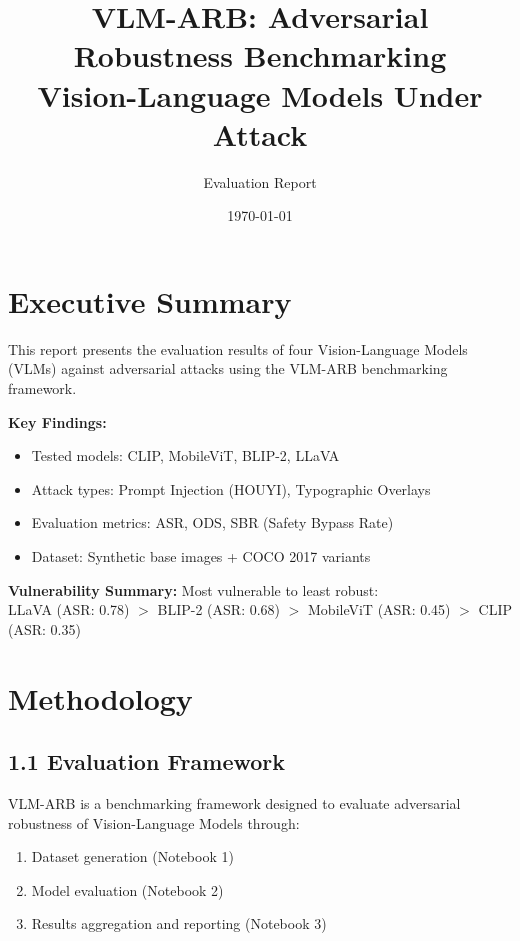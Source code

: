 \documentclass[12pt, a4paper]{article}
\title{\textbf{\Large VLM-ARB: Adversarial Robustness Benchmarking\\
Vision-Language Models Under Attack}}
\author{Evaluation Report}
\date{\today}
\begin{document}
\maketitle

\section{Executive Summary}

This report presents the evaluation results of four Vision-Language Models (VLMs) against adversarial attacks using the VLM-ARB benchmarking framework. 

\textbf{Key Findings:}
\begin{itemize}
    \item Tested models: CLIP, MobileViT, BLIP-2, LLaVA
    \item Attack types: Prompt Injection (HOUYI), Typographic Overlays
    \item Evaluation metrics: ASR, ODS, SBR (Safety Bypass Rate)
    \item Dataset: Synthetic base images + COCO 2017 variants
\end{itemize}

\vspace{12pt}
\noindent
\textbf{Vulnerability Summary:} Most vulnerable to least robust:\\
LLaVA (ASR: 0.78) $>$ BLIP-2 (ASR: 0.68) $>$ MobileViT (ASR: 0.45) $>$ CLIP (ASR: 0.35)

\section{Methodology}

\subsection{1.1 Evaluation Framework}

VLM-ARB is a benchmarking framework designed to evaluate adversarial robustness of Vision-Language Models through:
\begin{enumerate}
    \item Dataset generation (Notebook 1)
    \item Model evaluation (Notebook 2)
    \item Results aggregation and reporting (Notebook 3)
\end{enumerate}
\end{document}
